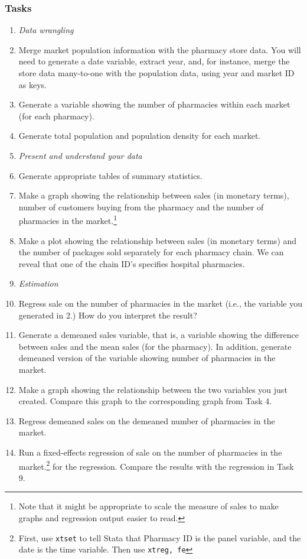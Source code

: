 \documentclass[12pt,a4paper]{article}
\begin{document}
\subsubsection*{Tasks}
\begin{enumerate}
 \item[] \emph{Data wrangling}
 \item Merge market population information with the pharmacy store data. You will need to generate a date variable, extract year, and, for instance, merge the store data many-to-one with the population data, using year and market ID as keys.
 \item Generate a variable showing the number of pharmacies within each market (for each pharmacy).
 \item Generate total population and population density for each market.
 \item[] \emph{Present and understand your data}
 \item Generate appropriate tables of summary statistics.
 \item Make a graph showing the relationship between sales (in monetary terms), number of customers buying from the pharmacy and the number of pharmacies in the market.\footnote{Note that it might be appropriate to scale the measure of sales to make graphs and regression output easier to read.}
 \item Make a plot showing the relationship between sales (in monetary terms) and the number of packages sold separately for each pharmacy chain. We can reveal that one of the chain ID's specifies hospital pharmacies.
 \item[] \emph{Estimation}
 \item Regress sale on the number of pharmacies in the market (i.e., the variable you generated in 2.) How do you interpret 
 the result?
 \item Generate a demeaned sales variable, that is, a variable showing the difference between sales and the mean sales (for the pharmacy). In addition, generate demeaned version of the variable showing number of pharmacies in the market.
 \item Make a graph showing the relationship between the two variables you just created. Compare this graph to the corresponding graph from Task 4.
 \item Regress demeaned sales on the demeaned number of pharmacies in the market.
 \item Run a fixed-effects regression of sale on the number of pharmacies in the market.\footnote{First, use \texttt{xtset} to tell Stata that Pharmacy ID is the panel variable, and the date is the time variable. Then use \texttt{xtreg, fe}} for the regression. Compare the results with the regression in Task 9.

\end{enumerate}
\end{document}
